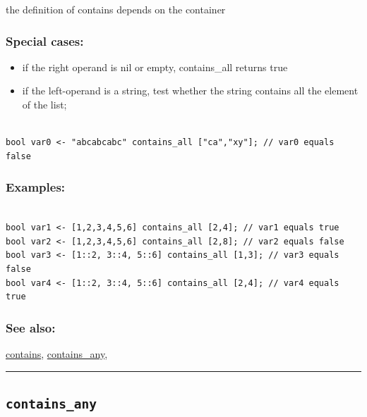 \documentclass[]{book}
\providecommand{\tightlist}{%
  \setlength{\itemsep}{0pt}\setlength{\parskip}{0pt}}
\theoremstyle{definition}
\theoremstyle{definition}
\theoremstyle{definition}
\theoremstyle{remark}
\begin{document}
the definition of contains depends on the container

\subsubsection{Special cases:}\label{special-cases-33}

\begin{itemize}
\tightlist
\item
  if the right operand is nil or empty, contains\_all returns true\\
\item
  if the left-operand is a string, test whether the string contains all
  the element of the list;
\end{itemize}

\begin{verbatim}
 
bool var0 <- "abcabcabc" contains_all ["ca","xy"]; // var0 equals false
\end{verbatim}

\subsubsection{Examples:}\label{examples-77}

\begin{verbatim}
 
bool var1 <- [1,2,3,4,5,6] contains_all [2,4]; // var1 equals true  
bool var2 <- [1,2,3,4,5,6] contains_all [2,8]; // var2 equals false 
bool var3 <- [1::2, 3::4, 5::6] contains_all [1,3]; // var3 equals false  
bool var4 <- [1::2, 3::4, 5::6] contains_all [2,4]; // var4 equals true
\end{verbatim}

\subsubsection{See also:}\label{see-also-63}

\href{operators-b-to-c.html\#contains}{contains},
\href{operators-b-to-c.html\#contains_any}{contains\_any},

\begin{center}\rule{0.5\linewidth}{\linethickness}\end{center}

\subsection{\texorpdfstring{\texttt{contains\_any}}{contains\_any}}\label{contains_any}
\end{document}
